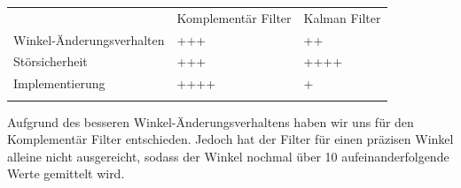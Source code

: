 \begin{tabular}{lll}
& Komplementär Filter & Kalman Filter\\
Winkel-Änderungsverhalten & +++& ++ \\
Störsicherheit & +++ &++++\\
Implementierung &++++ &+\\
&&\\
\end{tabular}

Aufgrund des besseren Winkel-Änderungsverhaltens haben wir uns für den Komplementär Filter entschieden. Jedoch hat der Filter für einen präzisen Winkel alleine nicht ausgereicht, sodass der Winkel nochmal über 10 aufeinanderfolgende Werte gemittelt wird.







\newpage
